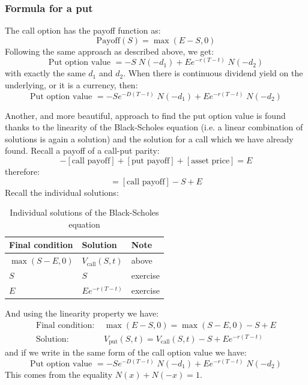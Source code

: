 \subsubsection{Formula for a put}
The call option has the payoff function as:
\begin{equation}
    \text{Payoff}(S) = \max(E-S, 0)
\end{equation}
Following the same approach as described above, we get:
\begin{equation}
    \text{Put option value } = -S \; N(-d_1) + Ee^{-r(T-t)} \; N(-d_2)  
\end{equation}
with exactly the same $d_1$ and $d_2$. When there is continuous dividend yield on the underlying, or it is a currency, then:
\begin{equation}
    \text{Put option value } = -S e^{-D(T-t)} \; N(-d_1) + E e^{-r(T-t)} \; N(-d_2)
\end{equation}

Another, and more beautiful, approach to find the put option value is found thanks to the linearity of the Black-Scholes equation (i.e. a linear combination of solutions is again a solution) and the solution for a call which we have already found. Recall a payoff of a call-put parity:
\begin{equation}
    -[\text{call payoff}] + [\text{put payoff}] + [\text{asset price}] = E
\end{equation}
therefore:
\begin{equation}
    [\text{put payoff}] = [\text{call payoff}] - S + E
\end{equation}
Recall the individual solutions:
\begin{table}[H]
\begin{center}
\caption{Individual solutions of the Black-Scholes equation}
\begin{tabular}{l | l | l}
	\toprule
    Final condition    & Solution               & Note     \\
    \midrule
    $\max(S-E, 0)$     & $V_{\text{call}}(S,t)$ & above    \\
    $S$                & $S$                    & exercise \\
    $E$                & $Ee^{-r(T-t)}$         & exercise \\
    \bottomrule
\end{tabular}
\end{center}
\end{table}
And using the linearity property we have:
\begin{align}
    \text{Final condition: } & \max(E-S, 0) = \max(S-E, 0) - S + E \\
    \text{Solution: }        & V_{\text{put}}(S,t) = V_{\text{call}}(S,t) - S + Ee^{-r(T-t)}
\end{align}
and if we write in the same form of the call option value we have:
\begin{equation}
    \text{Put option value } = -S e^{-D(T-t)} \; N(-d_1) + E e^{-r(T-t)} \; N(-d_2)
    \nonumber
\end{equation}
This comes from the equality $N(x) + N(-x) = 1$.

